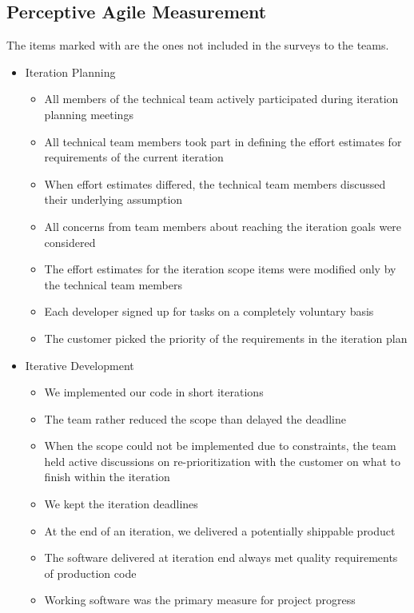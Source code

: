 \begin{appendices}
\chapter{Perceptive Agile Measurement}  %
\label{sec:pam}

The items marked with \XSolidBrush  are the ones not included in the surveys to the teams.

\begin{itemize}
	\item Iteration Planning
		\begin{itemize}
			\item All members of the technical team actively participated during iteration planning meetings
			\item All technical team members took part in defining the effort estimates for requirements of the current iteration
   			\item When effort estimates differed, the technical team members discussed their underlying assumption
   			\item All concerns from team members about reaching the iteration goals were considered
   			\item The effort estimates for the iteration scope items were modified only by the technical team members
   			\item Each developer signed up for tasks on a completely voluntary basis
   			\item The customer picked the priority of the requirements in the iteration plan
		\end{itemize}
	\item Iterative Development
		\begin{itemize}
			\item We implemented our code in short iterations
			\item The team rather reduced the scope than delayed the deadline
			\item When the scope could not be implemented due to constraints, the team held active discussions on re-prioritization with the customer on what to finish within the iteration
			\item We kept the iteration deadlines
			\item At the end of an iteration, we delivered a potentially shippable product
			\item The software delivered at iteration end always met quality requirements of production code
			\item Working software was the primary measure for project progress

\end{itemize}
\end{itemize}
\end{appendices}
